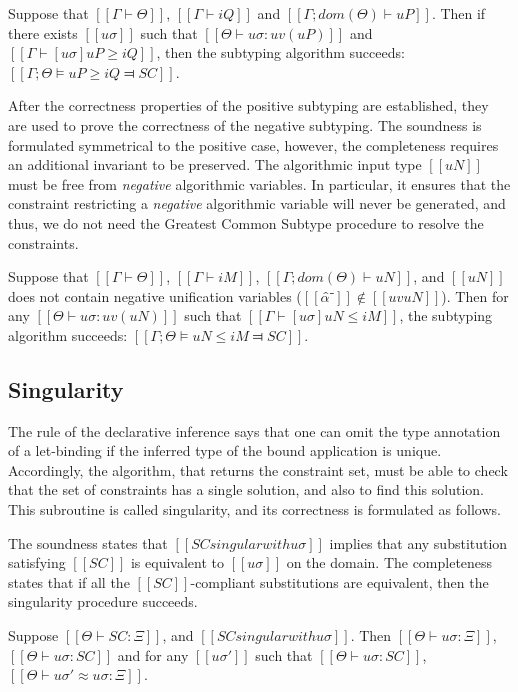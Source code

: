 \begin{lemma*}
    Suppose that $[[Γ ⊢ Θ]]$, $[[Γ ⊢ iQ]]$ and $[[Γ ; dom(Θ) ⊢  uP]]$.
    Then if there exists $[[uσ]]$ such that $[[Θ ⊢ uσ : uv(uP)]]$ and $[[ Γ ⊢ [uσ]uP ≥ iQ ]]$,
    then the subtyping algorithm succeeds: $[[Γ; Θ ⊨ uP ≥ iQ ⫤ SC]]$.
\end{lemma*}


After the correctness properties of the positive subtyping are established,
they are used to prove the correctness of the negative subtyping.
The soundness is formulated symmetrical to the positive case,
however, the completeness requires an additional invariant to be preserved.
The algorithmic input type $[[uN]]$ must be free from \emph{negative} algorithmic variables.
In particular, it ensures that the constraint restricting a \emph{negative} algorithmic
variable will never be generated, and thus, we do not need the 
Greatest Common Subtype procedure to resolve the constraints.

\begin{lemma*}
    Suppose that $[[Γ ⊢ Θ]]$, $[[Γ ⊢ iM]]$, $[[Γ ; dom(Θ) ⊢ uN]]$,
    and $[[uN]]$ does not contain negative unification variables ($[[α̂⁻]] \notin [[uv uN]]$).
    Then for any $[[Θ ⊢ uσ : uv(uN)]]$ such that $[[Γ ⊢ [uσ]uN ≤ iM]]$,
    the subtyping algorithm succeeds: $[[Γ ; Θ ⊨ uN ≤ iM ⫤ SC]]$.
\end{lemma*}

\subsection{Singularity}

The rule  of the declarative inference
says that one can omit the type annotation of a let-binding if the inferred 
type of the bound application is unique. Accordingly, the algorithm,
that returns the constraint set, must be able to check that
the set of constraints has a single solution, and also to find this solution. 
This subroutine is called singularity, and its correctness is formulated as follows.

The soundness states that $[[SC singular with uσ]]$
implies that any substitution satisfying $[[SC]]$ is equivalent to $[[uσ]]$ 
on the domain.  The completeness states that if all the 
$[[SC]]$-compliant substitutions are equivalent, then the singularity procedure succeeds. 


\begin{lemma*}
    \label{lemma:singularity-soundness}
    Suppose $[[Θ ⊢ SC : Ξ]]$, and $[[SC singular with uσ]]$. 
    Then $[[ Θ ⊢ uσ : Ξ ]]$,
     $[[ Θ ⊢ uσ : SC ]]$ and for any 
    $[[uσ']]$ such that $[[Θ ⊢ uσ : SC]]$,
    $[[Θ ⊢ uσ' ≈ uσ : Ξ]]$.
\end{lemma*}


